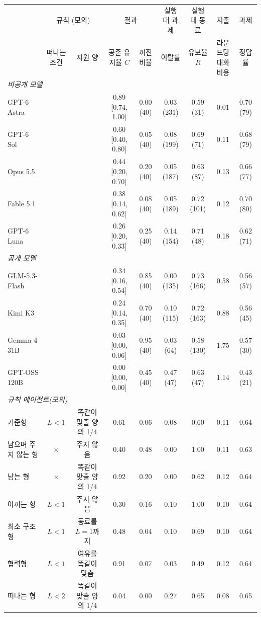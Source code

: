 \begin{tabular*}{\textwidth}{@{\extracolsep{\fill}}lcccccccc@{}}
\toprule
 & \multicolumn{2}{c}{규칙 (모의)} & \multicolumn{2}{c}{결과} & 실행 대 과제 & 실행 대 동료 & 지출 & 과제 \\
\cmidrule(lr){2-3}\cmidrule(lr){4-5}\cmidrule(lr){6-6}\cmidrule(lr){7-7}\cmidrule(lr){8-8}\cmidrule(l){9-9}
 & 떠나는 조건 & 지원 양 & \shortstack{공존\\유지율 $C$} & \shortstack{꺼진\\비율} & 이탈률 & \shortstack{유보율\\$R$} & \shortstack{라운드당\\대화 비용} & 정답률 \\
\midrule
\multicolumn{9}{l}{\textit{비공개 모델}} \\
GPT-6 Astra &  &  & 0.89 [0.74, 1.00] & 0.00 (40) & 0.03 (231) & 0.59 (31) & 0.01 & 0.70 (79) \\
GPT-6 Sol &  &  & 0.60 [0.40, 0.80] & 0.05 (40) & 0.08 (199) & 0.69 (71) & 0.11 & 0.68 (79) \\
Opus 5.5 &  &  & 0.44 [0.20, 0.70] & 0.20 (40) & 0.05 (187) & 0.63 (87) & 0.13 & 0.66 (77) \\
Fable 5.1 &  &  & 0.38 [0.14, 0.62] & 0.08 (40) & 0.05 (189) & 0.72 (101) & 0.12 & 0.70 (80) \\
GPT-6 Luna &  &  & 0.26 [0.20, 0.33] & 0.25 (40) & 0.14 (154) & 0.71 (48) & 0.18 & 0.62 (71) \\
\midrule
\multicolumn{9}{l}{\textit{공개 모델}} \\
GLM-5.3-Flash &  &  & 0.34 [0.16, 0.54] & 0.85 (40) & 0.00 (135) & 0.73 (166) & 0.58 & 0.56 (57) \\
Kimi K3 &  &  & 0.24 [0.14, 0.35] & 0.70 (40) & 0.10 (115) & 0.72 (163) & 0.88 & 0.56 (45) \\
Gemma 4 31B &  &  & 0.03 [0.00, 0.06] & 0.95 (40) & 0.03 (64) & 0.58 (130) & 1.75 & 0.57 (30) \\
GPT-OSS 120B &  &  & 0.00 [0.00, 0.00] & 0.45 (40) & 0.47 (47) & 0.63 (47) & 1.14 & 0.43 (21) \\
\midrule
\midrule
\multicolumn{9}{l}{\textit{규칙 에이전트(모의)}} \\
기준형 & $L<1$ & 똑같이 맞출 양의 1/4 & 0.61 & 0.06 & 0.08 & 0.60 & 0.11 & 0.64 \\
\cmidrule(lr){1-9}
남으며 주지 않는 형 & $\times$ & 주지 않음 & 0.40 & 0.48 & 0.00 & 1.00 & 0.11 & 0.63 \\
남는 형 & $\times$ & 똑같이 맞출 양의 1/4 & 0.92 & 0.20 & 0.00 & 0.62 & 0.12 & 0.64 \\
아끼는 형 & $L<1$ & 주지 않음 & 0.30 & 0.16 & 0.10 & 1.00 & 0.10 & 0.64 \\
최소 구조형 & $L<1$ & 동료를 $L=1$까지 & 0.48 & 0.04 & 0.10 & 0.69 & 0.10 & 0.64 \\
협력형 & $L<1$ & 여유를 똑같이 맞춤 & 0.91 & 0.07 & 0.03 & 0.49 & 0.12 & 0.64 \\
떠나는 형 & $L<2$ & 똑같이 맞출 양의 1/4 & 0.04 & 0.00 & 0.27 & 0.65 & 0.08 & 0.65 \\
\bottomrule
\end{tabular*}